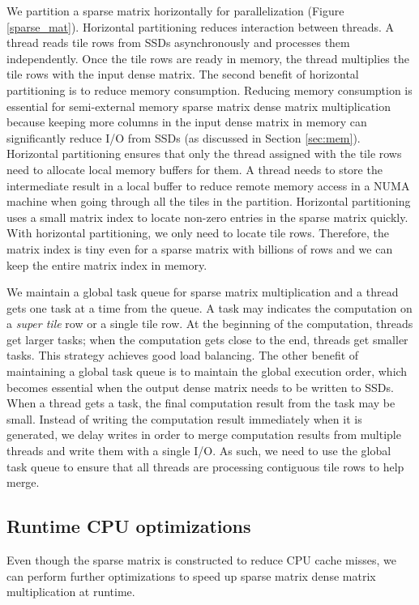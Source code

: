 We partition a sparse matrix horizontally for parallelization (Figure
\ref{sparse_mat}). Horizontal partitioning reduces interaction between threads.
A thread reads tile rows from SSDs asynchronously and processes them
independently. Once the tile rows
are ready in memory, the thread multiplies the tile rows with the input
dense matrix. The second benefit of horizontal partitioning is to reduce memory
consumption. Reducing memory consumption is essential for semi-external memory
sparse matrix dense matrix multiplication because keeping more columns in
the input dense matrix in memory can significantly reduce I/O from SSDs
(as discussed in Section \ref{sec:mem}). Horizontal partitioning ensures that
only the thread assigned with the tile rows need to allocate local memory buffers
for them. A thread needs to store the intermediate result in a local buffer to
reduce remote memory access in a NUMA machine when going through all the tiles
in the partition. Horizontal partitioning uses
a small matrix index to locate non-zero entries in the sparse matrix quickly.
With horizontal partitioning, we only need to locate tile rows. Therefore,
the matrix index is tiny even for a sparse matrix with billions of rows
and we can keep the entire matrix index in memory.

We maintain a global task queue for sparse matrix multiplication and a
thread gets one task at a time from the queue. A task may
indicates the computation on a \textit{super tile} row or a single tile row.
At the beginning of the computation, threads get larger tasks; when
the computation gets close to the end, threads get smaller tasks. This strategy
achieves good load balancing. The other benefit of maintaining a global
task queue is to maintain the global execution order, which becomes essential
when the output dense matrix needs to be written to SSDs. When a thread gets
a task, the final computation result from the task may be small. Instead of
writing the computation result immediately when it is generated, we delay
writes in order to merge
computation results from multiple threads and write them with a single I/O.
As such, we need to use the global task queue to ensure that all threads are
processing contiguous tile rows to help merge.

\subsection{Runtime CPU optimizations} \label{sec:cpu}
Even though the sparse matrix is constructed to reduce CPU cache misses,
we can perform further optimizations to speed up sparse matrix dense matrix
multiplication at runtime.

